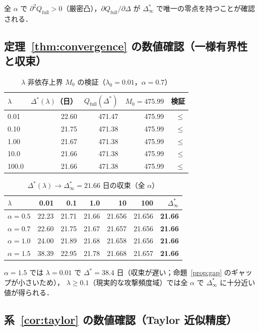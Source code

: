 \documentclass[12pt,a4paper]{article}
\theoremstyle{plain}
\theoremstyle{definition}
\theoremstyle{remark}
\newcommand{\Qf}{Q_{\mathrm{full}}}
\newcommand{\Dopt}{\Delta^{*}}
\newcommand{\Dinf}{\Delta^{*}_{\infty}}
\begin{document}
全 $\alpha$ で $\partial^2\Qf>0$（厳密凸），$\partial\Qf/\partial\Delta$ が $\Dinf$ で唯一の零点を持つことが確認される．

\subsection{定理~\ref{thm:convergence} の数値確認（一様有界性と収束）}

\begin{table}[h]
\centering
\caption{$\lambda$ 非依存上界 $M_0$ の検証（$\lambda_0=0.01$，$\alpha=0.7$）}
\label{tab:compact}
\begin{tabular}{@{}lrrrr@{}}
\toprule
$\lambda$ & $\Dopt(\lambda)$（日）& $\Qf(\Dopt)$ & $M_0=475.99$ & 検証 \\
\midrule
0.01 & 22.60 & 471.47 & 475.99 & $\le$ \\
0.10 & 21.75 & 471.38 & 475.99 & $\le$ \\
1.00 & 21.67 & 471.38 & 475.99 & $\le$ \\
10.0 & 21.66 & 471.38 & 475.99 & $\le$ \\
100.0 & 21.66 & 471.38 & 475.99 & $\le$ \\
\bottomrule
\end{tabular}
\end{table}

\begin{table}[h]
\centering
\caption{$\Dopt(\lambda)\to\Dinf=21.66$ 日の収束（全 $\alpha$）}
\label{tab:convergence}
\begin{tabular}{@{}lrrrrrr@{}}
\toprule
$\lambda$ & 0.01 & 0.1 & 1.0 & 10 & 100 & $\Dinf$ \\
\midrule
$\alpha=0.5$ & 22.23 & 21.71 & 21.66 & 21.656 & 21.656 & \textbf{21.66} \\
$\alpha=0.7$ & 22.60 & 21.75 & 21.67 & 21.657 & 21.656 & \textbf{21.66} \\
$\alpha=1.0$ & 24.00 & 21.89 & 21.68 & 21.658 & 21.656 & \textbf{21.66} \\
$\alpha=1.5$ & 38.39 & 22.95 & 21.78 & 21.668 & 21.657 & \textbf{21.66} \\
\bottomrule
\end{tabular}
\end{table}

$\alpha=1.5$ では $\lambda=0.01$ で $\Dopt=38.4$ 日（収束が遅い；命題~\ref{prop:gap} のギャップが小さいため），
$\lambda\ge0.1$（現実的な攻撃頻度域）では全 $\alpha$ で $\Dinf$ に十分近い値が得られる．

\subsection{系~\ref{cor:taylor} の数値確認（Taylor 近似精度）}
\end{document}
